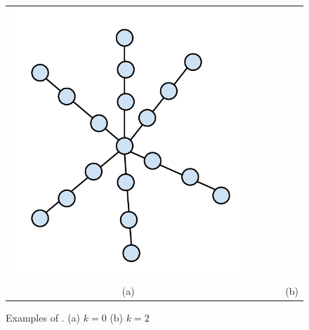 \begin{figure}[t]
\begin{tabular}[h]{ccccc}
    \includegraphics[scale=0.3]{../img/kstar.pdf}\\
    (a) &&&& (b)
  \end{tabular}
  \caption{\figtabsize Examples of {\kstars}. (a) $k = 0$ (b) $k = 2$
  }
  \label{fig:ksubstar}
\end{figure}


